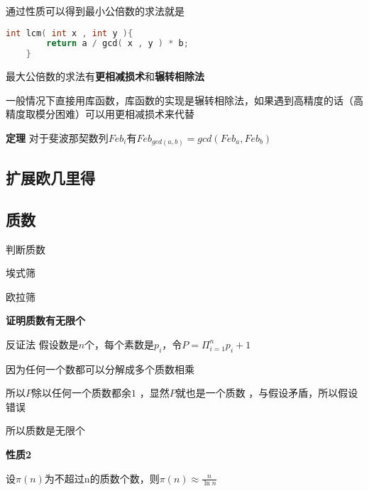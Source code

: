 通过性质可以得到最小公倍数的求法就是
\begin{lstlisting}[language = c]
    int lcm( int x , int y ){
        return a / gcd( x , y ) * b;
    }
\end{lstlisting}
最大公倍数的求法有\textbf{更相减损术}和\textbf{辗转相除法}



一般情况下直接用库函数，库函数的实现是辗转相除法，如果遇到高精度的话（高精度取模分困难）可以用更相减损术来代替

\textbf{定理} 对于斐波那契数列$Feb_i$有$Feb_{gcd(a,b)}=gcd(Feb_a , Feb_b)$

\subsection{扩展欧几里得}


\subsection{质数}
判断质数

埃式筛

欧拉筛


\textbf{证明质数有无限个}

反证法 假设数是$n$个，每个素数是$p_i$，令$P = \Pi_{i=1}^{n} p_i + 1$

因为任何一个数都可以分解成多个质数相乘

所以$P$除以任何一个质数都余$1$ ，显然$P$就也是一个质数 ，与假设矛盾，所以假设错误

所以质数是无限个

\textbf{性质2}

设$\pi(n)$为不超过n的质数个数，则$\pi(n) \approx \frac{n}{\ln{n}}$





